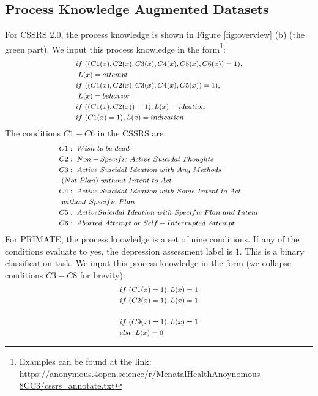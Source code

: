 \documentclass[letterpaper]{article} %
\begin{document}
\subsection{Process Knowledge Augmented Datasets}
For CSSRS 2.0, the process knowledge is shown in Figure \ref{fig:overview} (b) (the green part). We input this process knowledge in the form\footnote{Examples can be found at the link: \url{https://anonymous.4open.science/r/MenatalHealthAnoynomous-8CC3/cssrs_annotate.txt}}:
\begin{equation*}
\footnotesize
\begin{split}
    & if~((C1(x),C2(x),C3(x),C4(x),C5(x),C6(x)) = 1),\\
    &~L(x) = attempt \\
    & if~((C1(x),C2(x),C3(x),C4(x),C5(x)) = 1),\\
    &~L(x) = behavior \\
    & if~((C1(x),C2(x))=1), L(x) = ideation\\
    & if~(C1(x)=1), L(x)=indication
\end{split}
\end{equation*}
The conditions $C1-C6$ in the CSSRS are:
\begin{equation*}
\footnotesize
\begin{split}
    & C1:~Wish~to~be~dead \\
    & C2:~Non-Specific~Active~Suicidal~Thoughts \\
    & C3:~Active~Suicidal~Ideation~with~Any~Methods\\
    &~(Not~Plan)~without~Intent~to~Act \\
    & C4:~Active~Suicidal~Ideation~with~Some~Intent~to~Act\\
    &~without~Specific~Plan\\
    & C5:~Active Suicidal~Ideation~with~Specific~Plan~and~Intent\\
    & C6:~Aborted~Attempt~or~Self-Interrupted~Attempt
\end{split}
\end{equation*}
For PRIMATE, the process knowledge is a set of nine conditions. If any of the conditions evaluate to yes, the depression assessment label is $1$. This is a binary classification task. We input this process knowledge in the form (we collapse conditions $C3-C8$ for brevity):
\begin{equation*}
\footnotesize
\begin{split}
    & if~(C1(x)=1), L(x) = 1\\
    & if~(C2(x)=1), L(x) = 1\\
    & \dots \\
    & if~(C9(x)=1), L(x) = 1\\
    & else, L(x) = 0
\end{split}
\end{equation*}
\end{document}
